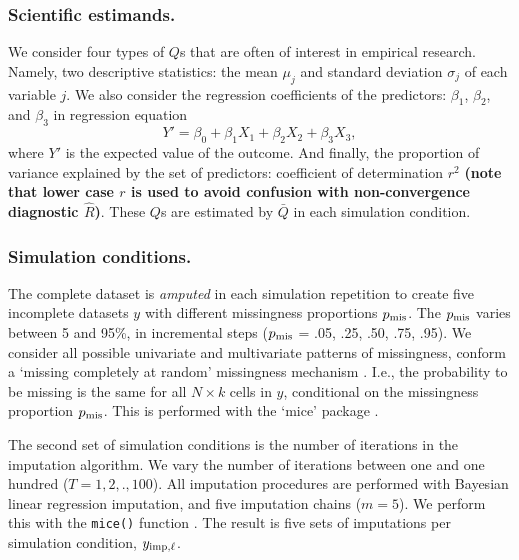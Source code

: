 \documentclass[Royal,times,sageh]{sagej}
\begin{document}
\hypertarget{scientific-estimands.}{%
\subsubsection{Scientific estimands.}\label{scientific-estimands.}}

We consider four types of \(Q\)s that are often of interest in empirical research. Namely, two descriptive statistics: the mean \(\mu_j\) and standard deviation \(\sigma_j\) of each variable \(j\). We also consider the regression coefficients of the predictors: \(\beta_1\), \(\beta_2\), and \(\beta_3\) in regression equation
\[Y' = \beta_0 + \beta_1 X_1 + \beta_2 X_2 + \beta_3 X_3,\]
where \(Y'\) is the expected value of the outcome. And finally, the proportion of variance explained by the set of predictors: coefficient of determination \(r^2\) \textbf{(note that lower case \(r\) is used to avoid confusion with non-convergence diagnostic \(\widehat{R}\))}. These \(Q\)s are estimated by \(\bar{Q}\) in each simulation condition.

\hypertarget{simulation-conditions.}{%
\subsubsection{Simulation conditions.}\label{simulation-conditions.}}

The complete dataset is \emph{amputed} in each simulation repetition to create five incomplete datasets \(y\) with different missingness proportions \(p_{\rm mis}\). The \(p_{\rm mis}\) varies between 5 and 95\%, in incremental steps (\(p_{\rm mis}\) = .05, .25, .50, .75, .95). We consider all possible univariate and multivariate patterns of missingness, conform a `missing completely at random' missingness mechanism \citep{rubin87}. I.e., the probability to be missing is the same for all \(N \times k\) cells in \(y\), conditional on the missingness proportion \(p_{\rm mis}\). This is performed with the `mice' package \citep[function \texttt{mice::ampute()};][]{mice}.

The second set of simulation conditions is the number of iterations in the imputation algorithm. We vary the number of iterations between one and one hundred (\(T = 1,2,.,100\)). All imputation procedures are performed with Bayesian linear regression imputation, and five imputation chains (\(m=5\)). We perform this with the \texttt{mice()} function \citep{mice}. The result is five sets of imputations per simulation condition, \(y_{\rm imp, \ell}\).
\end{document}
